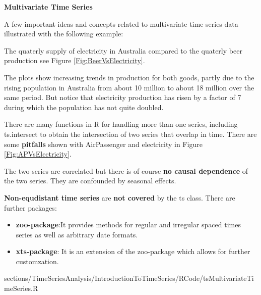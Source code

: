 			\RTheory
			{
				\textbf{Multivariate Time Series}
				
				\vfill
				
				A few important ideas and concepts related to multivariate time series data illustrated with the following example:\vfill
				
				\hfill
				
				\break
				
				The quaterly supply of electricity in Australia compared to the quaterly beer production see Figure \ref{Fig:BeerVsElectricity}.
				
				\vfill
				
				The plots show increasing trends in production for both goods, partly
				due to the rising population in Australia from about 10 million to about 18 million over the same period. But notice that electricity production has risen by a factor of 7 during which the population has not quite doubled. \vfill
				
				\hfill
				
				\break
				
				There are many functions in {\color{blue}R} for handling more than one series, including {\color{blue}ts.intersect} to obtain the intersection of two series that overlap in time. There are some \textbf{pitfalls} shown with AirPassenger and electricity in Figure \ref{Fig:APVsElectricity}. 
				
				\vfill
				
				\hfill
				
				\break
				
				The two series are correlated but there is of course \textbf{no causal dependence} of the two series. They are confounded by seasonal effects.
				
				\vfill
				
				\hfill
				
				\break
				
				\textbf{Non-equdistant time series} are \textbf{not covered} by the {\color{blue}ts} class. There are further packages:
				
				\begin{itemize}
					\item \textbf{{\color{blue}zoo-}package}:It provides methods for regular and irregular spaced times series as well as arbitrary date formats.
					\item \textbf{{\color{blue}xts-}package}: It is an extension of the {\color{blue}zoo-}package which allows for further customzation.
				\end{itemize}
			}
			{
				sections/TimeSeriesAnalysis/IntroductionToTimeSeries/RCode/tsMultivariateTimeSeries.R
			}
			
